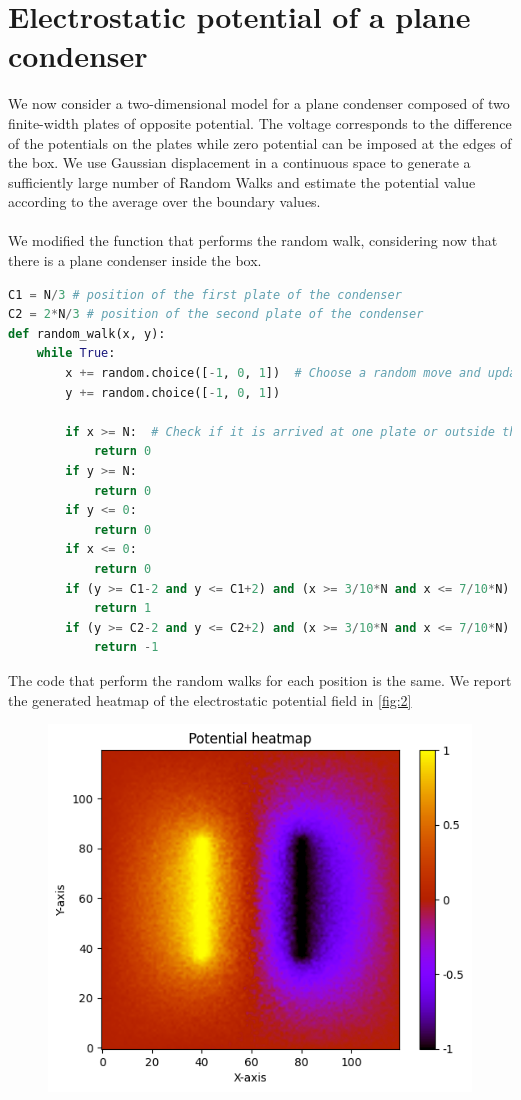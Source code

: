 \documentclass{article}
\begin{document}
\section{Electrostatic potential of a plane condenser}
We now consider a two-dimensional model for a plane condenser composed of two finite-width plates of opposite potential. The voltage corresponds to the difference of the potentials on the plates while zero potential can be imposed at the edges of the box. We use Gaussian displacement in a continuous space to generate a sufficiently large number of Random Walks and estimate the potential value according to the average over the boundary values.\\\\
We modified the function that performs the random walk, considering now that there is a plane condenser inside the box.
\begin{lstlisting}[language=Python]
C1 = N/3 # position of the first plate of the condenser
C2 = 2*N/3 # position of the second plate of the condenser
def random_walk(x, y):
    while True:
        x += random.choice([-1, 0, 1])  # Choose a random move and update the position
        y += random.choice([-1, 0, 1])

        if x >= N:  # Check if it is arrived at one plate or outside the box
            return 0
        if y >= N:
            return 0
        if y <= 0:
            return 0
        if x <= 0:
            return 0
        if (y >= C1-2 and y <= C1+2) and (x >= 3/10*N and x <= 7/10*N):
            return 1
        if (y >= C2-2 and y <= C2+2) and (x >= 3/10*N and x <= 7/10*N):
            return -1
\end{lstlisting}
The code that perform the random walks for each position is the same. We report the generated heatmap of the electrostatic potential field in \autoref{fig:2}
\begin{figure}[H]
    \centering
    \includegraphics[width=.7\linewidth]{images/Figure2.png}
    \caption{}
    \label{fig:2}
\end{figure}
\clearpage
\end{document}
